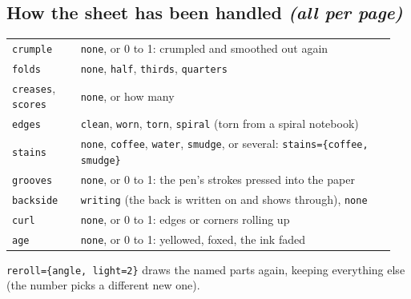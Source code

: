 \documentclass[11pt]{article}
\newcommand{\opt}[1]{\texttt{#1}}
\begin{document}
\subsection*{How the sheet has been handled \emph{(all per page)}}
\begin{tabular}{@{}p{0.17\linewidth}p{0.78\linewidth}@{}}
\toprule
\opt{crumple} & \opt{none}, or 0 to 1: crumpled and smoothed out again\\
\opt{folds} & \opt{none}, \opt{half}, \opt{thirds}, \opt{quarters}\\
\opt{creases}, \opt{scores} & \opt{none}, or how many\\
\opt{edges} & \opt{clean}, \opt{worn}, \opt{torn}, \opt{spiral} (torn from a spiral notebook)\\
\opt{stains} & \opt{none}, \opt{coffee}, \opt{water}, \opt{smudge}, or several: \opt{stains=\{coffee, smudge\}}\\
\opt{grooves} & \opt{none}, or 0 to 1: the pen's strokes pressed into the paper\\
\opt{backside} & \opt{writing} (the back is written on and shows through), \opt{none}\\
\opt{curl} & \opt{none}, or 0 to 1: edges or corners rolling up\\
\opt{age} & \opt{none}, or 0 to 1: yellowed, foxed, the ink faded\\
\bottomrule
\end{tabular}

\opt{reroll=\{angle, light=2\}} draws the named parts again, keeping everything else (the
number picks a different new one).
\end{document}
